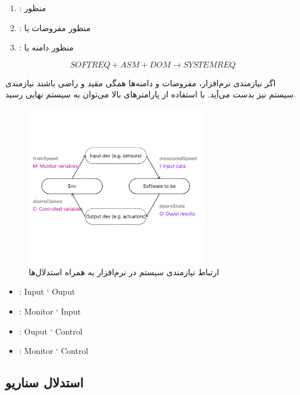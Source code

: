 \begin{enumerate}
    \item {}: منظور 
    \item {}: منظور مفروضات یا 
    \item {}: منظور دامنه یا 
\end{enumerate}

\begin{equation}
    SOFTREQ + ASM + DOM \rightarrow SYSTEMREQ
\end{equation}

اگر نیازمندی نرم‌افزار، مفروضات و دامنه‌ها همگی مقید و راضی باشند نیازمندی سیستم
نیز بدست می‌آید. با استفاده از پارامتر‌های بالا می‌توان به سیستم نهایی رسید.

\newpage

\begin{figure}[H]
    \centering
    \includegraphics[width=0.7\textwidth]{images/train_sysreq.png}
    \caption{ارتباط نیازمندی سیستم در نرم‌افزار به همراه استدلال‌ها}
    \label{fig: }
\end{figure}


\begin{LTR}
    \begin{itemize}
        \item {}: Input ` Ouput
        \item {}: Monitor ` Input
        \item {}: Ouput ` Control
        \item {}: Monitor ` Control
    \end{itemize}
\end{LTR}

\subsection*{استدلال سناریو}

